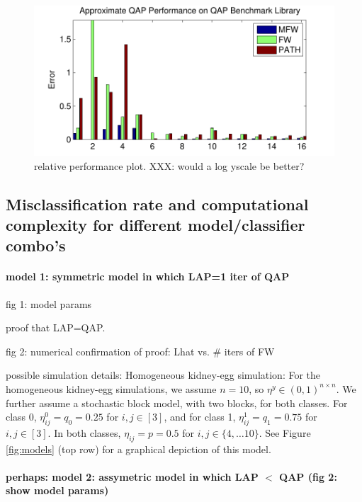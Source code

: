\begin{figure}[htbp]
	\centering			
	\includegraphics[width=1.0\linewidth]{../figs/benchmarks.pdf}
	\caption{relative performance plot. XXX: would a log yscale be better?}
	\label{fig:fwpath}
\end{figure}


\subsection{Misclassification rate and computational complexity for different model/classifier combo's}



\paragraph{model 1: symmetric model in which LAP=1 iter of QAP} %
\label{par:homogeneous_kidney_egg_simulation}

fig 1: model params

proof that LAP=QAP.

fig 2: numerical confirmation of proof: Lhat vs. \# iters of FW

possible simulation details: Homogeneous kidney-egg simulation: For the homogeneous kidney-egg simulations, we assume $n=10$, so $\eta^y \in (0,1)^{n\times n}$.  We further assume a stochastic block model, with two blocks, for both classes.  For class 0, $\eta_{ij}^0=q_0=0.25$ for $i,j \in [3]$, and for class 1, $\eta_{ij}^1=q_1=0.75$ for $i,j \in [3]$.  In both classes, $\eta_{ij}=p=0.5$ for $i,j \in \{4,\ldots 10\}$.  See Figure \ref{fig:models} (top row) for a graphical depiction of this model.  





\paragraph{perhaps: model 2: assymetric model in which LAP $<$ QAP (fig 2: show model params)} %
\label{par:homogeneous_kidney_egg_simulation}

